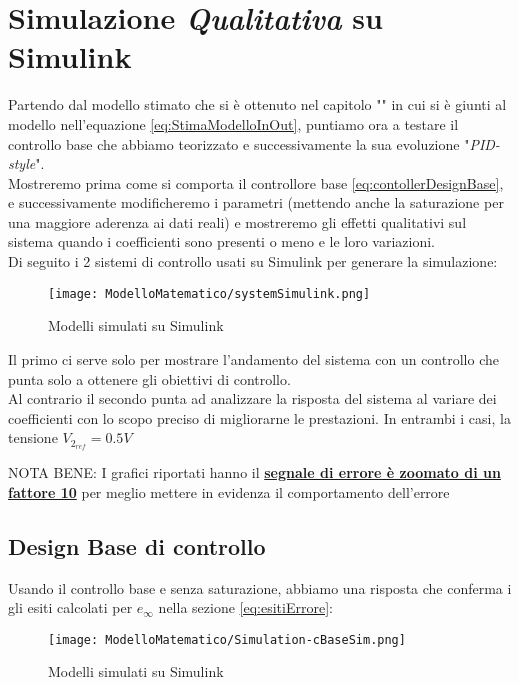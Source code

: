 \section{Simulazione \textit{Qualitativa} su Simulink}
Partendo dal modello stimato che si è ottenuto nel capitolo "" in cui si è giunti al modello nell'equazione \ref{eq:StimaModelloInOut}, puntiamo ora a testare il controllo base che abbiamo teorizzato e successivamente la sua evoluzione "\textit{PID-style}".\\
Mostreremo prima come si comporta il controllore base \ref{eq:contollerDesignBase}, e successivamente modificheremo i parametri (mettendo anche la saturazione per una maggiore aderenza ai dati reali) e mostreremo gli effetti qualitativi sul sistema quando i coefficienti sono presenti o meno e le loro variazioni.\\
Di seguito i 2 sistemi di controllo usati su Simulink per generare la simulazione:
\begin{figure}[H]
	\centering
	\caption[Modelli simulati su Simulink]{Modelli simulati su Simulink}
	\texttt{[image: ModelloMatematico/systemSimulink.png]}
\end{figure}

\noindent
Il primo ci serve solo per mostrare l'andamento del sistema con un controllo che punta solo a ottenere gli obiettivi di controllo.\\
Al contrario il secondo punta ad analizzare la risposta del sistema al variare dei coefficienti con lo scopo preciso di migliorarne le prestazioni.
In entrambi i casi, la tensione $ V_{2_{ref}} = 0.5V$ 

\noindent
{\footnotesize NOTA BENE: I grafici riportati hanno il \textbf{\underline{segnale di errore è zoomato di un fattore 10}} per meglio mettere in evidenza il comportamento dell'errore}

\newpage

\subsection{Design Base di controllo}
Usando il controllo base e senza saturazione, abbiamo una risposta che conferma i gli esiti calcolati per $ e_\infty $ nella sezione \ref{eq:esitiErrore}:
\begin{figure}[H]
	\centering
	\caption[Modelli simulati su Simulink]{Modelli simulati su Simulink}
	\texttt{[image: ModelloMatematico/Simulation-cBaseSim.png]}
\end{figure}

